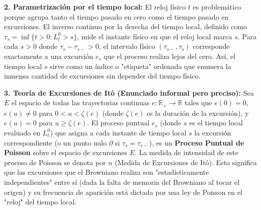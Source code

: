 \documentclass[11pt, letterpaper]{article}
\begin{document}
\begin{solucion}
    \textbf{2. Parametrización por el tiempo local:}
    El reloj físico $t$ es problemático porque agrupa tanto el tiempo pasado en cero como el tiempo pasado en excursiones.
    El inverso continuo por la derecha del tiempo local, definido como $\tau_s = \inf\{t > 0 : L_t^0 > s\}$, mide el instante físico en que el reloj local marca $s$.
    Para cada $s > 0$ donde $\tau_s - \tau_{s-} > 0$, el intervalo físico $(\tau_{s-}, \tau_s)$ corresponde exactamente a una excursión $e_s$ que el proceso realiza lejos del cero. Así, el tiempo local $s$ sirve como un índice o "etiqueta" ordenada que enumera la inmensa cantidad de excursiones sin depender del tiempo físico.

    \textbf{3. Teoría de Excursiones de Itô (Enunciado informal pero preciso):}
    Sea $E$ el espacio de todas las trayectorias continuas $e: \mathbb{R}_+ \to \mathbb{R}$ tales que $e(0) = 0$, $e(u) \neq 0$ para $0 < u < \zeta(e)$ (donde $\zeta(e)$ es la duración de la excursión), y $e(u) = 0$ para $u \ge \zeta(e)$.
    El proceso puntual $e_s$ (donde $s$ es el tiempo local evaluado en $L_t^0$) que asigna a cada instante de tiempo local $s$ la excursión correspondiente (o un punto nulo $\partial$ si $\tau_s = \tau_{s-}$), es un \textbf{Proceso Puntual de Poisson} sobre el espacio de excursiones $E$.
    La medida de intensidad de este proceso de Poisson se denota por $n$ (Medida de Excursiones de Itô). Esto significa que las excursiones que el Browniano realiza son "estadísticamente independientes" entre sí (dada la falta de memoria del Browniano al tocar el origen) y su frecuencia de aparición está dictada por una ley de Poisson en el "reloj" del tiempo local.
\end{solucion}

\newpage
\end{document}
